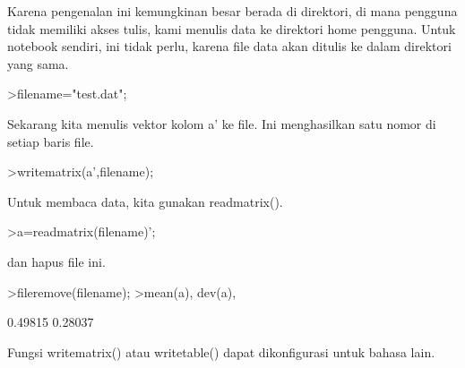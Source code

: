 \documentclass{article}
\begin{document}
\begin{eulernotebook}
\begin{eulercomment}
\begin{eulercomment}
\begin{eulercomment}
Karena pengenalan ini kemungkinan besar berada di direktori, di mana
pengguna tidak memiliki akses tulis, kami menulis data ke direktori
home pengguna. Untuk notebook sendiri, ini tidak perlu, karena file
data akan ditulis ke dalam direktori yang sama.
\end{eulercomment}
\begin{eulerprompt}
>filename="test.dat";
\end{eulerprompt}
\begin{eulercomment}
Sekarang kita menulis vektor kolom a' ke file. Ini menghasilkan satu
nomor di setiap baris file.
\end{eulercomment}
\begin{eulerprompt}
>writematrix(a',filename);
\end{eulerprompt}
\begin{eulercomment}
Untuk membaca data, kita gunakan readmatrix().
\end{eulercomment}
\begin{eulerprompt}
>a=readmatrix(filename)';
\end{eulerprompt}
\begin{eulercomment}
dan hapus file ini.
\end{eulercomment}
\begin{eulerprompt}
>fileremove(filename);
>mean(a), dev(a),
\end{eulerprompt}
\begin{euleroutput}
  0.49815
  0.28037
\end{euleroutput}
\begin{eulercomment}
Fungsi writematrix() atau writetable() dapat dikonfigurasi untuk
bahasa lain.


\end{eulercomment}
\end{eulercomment}
\end{eulercomment}
\end{eulernotebook}
\end{document}
